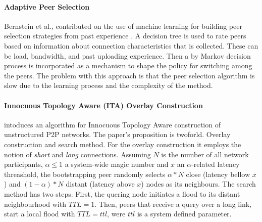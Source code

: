 %
%


\paragraph*{\bf Adaptive Peer Selection}
Bernstein et al., contributed on the use of machine learning for building peer
selection strategies from past experience \cite{bflz_adaptpeersel_2003}. A
decision tree is used to rate peers based on information about connection
characteristics that is collected. These can be load, bandwidth, and past
uploading experience. Then a by Markov decision process is incorporated as a
mechanism to shape the policy for switching among the peers. The problem
with this approach is that the peer selection algorithm is slow due to the
learning process and the complexity of the method.

\paragraph*{\bf Innocuous Topology Aware (ITA) Overlay Construction}
\cite{prfm_ita_2009} intoduces an algorithm for Innocuous Topology Aware
construction of unstructured P2P networks. The paper's proposition is twoforld.
Overlay construction and search method. For the overlay construction it employs
the notion of \emph{short} and \emph{long} connections. Assuming $N$ is the
number of all network participants, $\alpha \leq 1 $ a system-wide magic number
and $x$ an $\alpha$-related latency threashold, the bootstrapping peer randomly
selects $\alpha \ast N$ close (latency bellow $x$) and
$\left( 1 - \alpha \right) \ast N$ distant (latency above $x$) nodes as its
neighbours. The search method has two steps. First, the quering node initiates a
flood to its distant neighbourhood with $TTL = 1$. Then, peers that receive a
query over a long link, start a local flood with $TTL = ttl$, were $ttl$ is a
system defined parameter.

